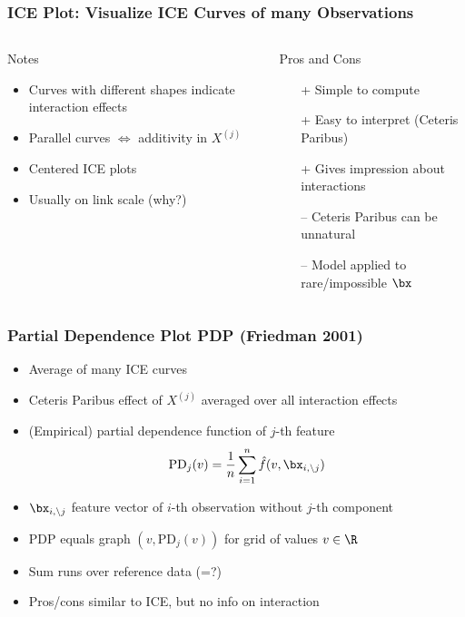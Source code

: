 \begin{frame}
	\frametitle{ICE Plot: Visualize ICE Curves of many Observations}
	\begin{example}
	\end{example}
	
	\begin{columns}[onlytextwidth]
		\begin{block}{Notes}
			\begin{itemize}
				\item Curves with different shapes indicate interaction effects
				\item Parallel curves $\Leftrightarrow$ additivity in $X^{(j)}$
				\item Centered ICE plots
				\item Usually on link scale (why?)
			\end{itemize}
		\end{block}
		
		\begin{alertblock}{Pros and Cons}
			\begin{itemize}
				\item[+] Simple to compute
				\item[+] Easy to interpret (Ceteris Paribus)
				\item[+] Gives impression about interactions
				\item[--] Ceteris Paribus can be unnatural
				\item[--] Model applied to rare/impossible $\bx$
			\end{itemize}
		\end{alertblock}
	\end{columns}
\end{frame}

\begin{frame}
	\frametitle{Partial Dependence Plot PDP (Friedman 2001)}
	\begin{itemize}
		\item Average of many ICE curves
		\item Ceteris Paribus effect of $X^{(j)}$ averaged over all interaction effects
		\item (Empirical) partial dependence function of $j$-th feature
		$$
		\text{PD}_j(v) = \frac{1}{n} \sum_{i = 1}^n \hat f(v, \bx_{i,\setminus j})
		$$
		\item $\bx_{i,\setminus j}$ feature vector of $i$-th observation without $j$-th component
		\item PDP equals graph $(v, \text{PD}_j(v))$ for grid of values $v \in \R$
		\item Sum runs over reference data (=?)
		\item Pros/cons similar to ICE, but no info on interaction
	\end{itemize}
	
	\vfill 
	
	\begin{example}
	\end{example}
\end{frame}

